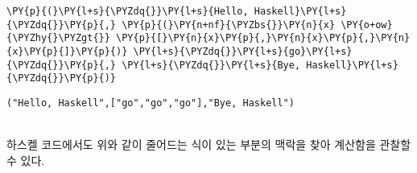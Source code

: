     
    \begin{tcolorbox}[breakable, size=fbox, boxrule=1pt, pad at break*=1mm,colback=cellbackground, colframe=cellborder]
\begin{Verbatim}[commandchars=\\\{\}]
\PY{p}{(}\PY{l+s}{\PYZdq{}}\PY{l+s}{Hello, Haskell}\PY{l+s}{\PYZdq{}}\PY{p}{,} \PY{p}{(}\PY{n+nf}{\PYZbs{}}\PY{n}{x} \PY{o+ow}{\PYZhy{}\PYZgt{}} \PY{p}{[}\PY{n}{x}\PY{p}{,}\PY{n}{x}\PY{p}{,}\PY{n}{x}\PY{p}{]}\PY{p}{)} \PY{l+s}{\PYZdq{}}\PY{l+s}{go}\PY{l+s}{\PYZdq{}}\PY{p}{,} \PY{l+s}{\PYZdq{}}\PY{l+s}{Bye, Haskell}\PY{l+s}{\PYZdq{}}\PY{p}{)}
\end{Verbatim}
\end{tcolorbox}

    
    \begin{Verbatim}[commandchars=\\\{\}]
("Hello, Haskell",["go","go","go"],"Bye, Haskell")
    \end{Verbatim}

    ~\\[-2ex]\noindent
    하스켈 코드에서도 위와 같이 줄어드는 식이 있는 부분의 맥락을 찾아
계산함을 관찰할 수 있다.

\lipsum[1-2]

    \begin{tcolorbox}[breakable, size=fbox, boxrule=1pt, pad at break*=1mm,colback=cellbackground, colframe=cellborder]
\begin{Verbatim}[commandchars=\\\{\}]

\end{Verbatim}
\end{tcolorbox}


    
    
    
